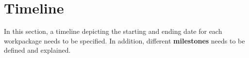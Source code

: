 \chapter{Timeline}
In this section, a timeline depicting the starting and ending date for each workpackage needs to be specified.
In addition, different \textbf{milestones} needs to be defined and explained.




